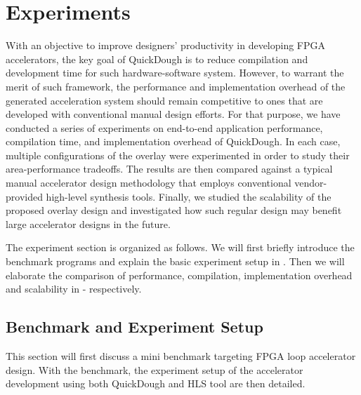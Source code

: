 \chapter{Experiments} \label{chapter:experiments}
With an objective to improve designers' productivity in developing FPGA accelerators, the key goal of QuickDough is to reduce compilation and development time for such hardware-software system. However, to warrant the merit of such framework, the performance and implementation overhead of the generated acceleration system should remain competitive to ones that are developed with conventional manual design efforts. For that purpose, we have conducted a series of experiments on end-to-end
application performance, compilation time, and implementation overhead of QuickDough. In each case,
multiple configurations of the overlay were experimented in order to study their area-performance
tradeoffs. The results are then compared against a typical manual accelerator design methodology
that employs conventional vendor-provided high-level synthesis tools. Finally, we studied the
scalability of the proposed overlay design and investigated how such regular design may benefit
large accelerator designs in the future.

The experiment section is organized as follows. We will first briefly introduce the benchmark programs and explain the basic experiment setup in . Then we will elaborate the comparison of performance, compilation, implementation overhead and scalability in - respectively. 

\section{Benchmark and Experiment Setup} \label{sec:benchmark-setup}
This section will first discuss a mini benchmark targeting FPGA loop accelerator design. With the benchmark, the experiment setup of the accelerator development using both QuickDough and HLS tool are then detailed. 


